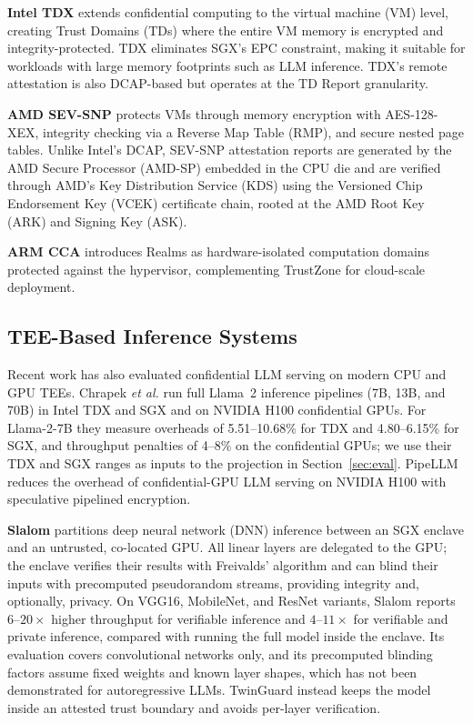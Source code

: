 \documentclass{ieeeaccess}
\begin{document}
\textbf{Intel TDX} \cite{inteltdx2023} extends confidential computing to the virtual machine (VM) level, creating Trust Domains (TDs) where the entire VM
memory is encrypted and integrity-protected. TDX eliminates SGX's EPC
constraint, making it suitable for workloads with large memory footprints
such as LLM inference. TDX's remote attestation is also DCAP-based but
operates at the TD Report granularity.

\textbf{AMD SEV-SNP} \cite{amdsev2020} protects VMs through memory
encryption with AES-128-XEX, integrity checking via a Reverse Map Table (RMP),
and secure nested page tables. Unlike Intel's DCAP, SEV-SNP attestation
reports are generated by the AMD Secure Processor (AMD-SP) embedded in the
CPU die and are verified through AMD's Key Distribution Service (KDS) using
the Versioned Chip Endorsement Key (VCEK) certificate chain, rooted at the
AMD Root Key (ARK) and Signing Key (ASK).

\textbf{ARM CCA} \cite{armcca2022} introduces Realms as hardware-isolated
computation domains protected against the hypervisor, complementing
TrustZone \cite{pinto2019demystifying} for cloud-scale deployment.

\subsection{TEE-Based Inference Systems}

Recent work has also evaluated confidential LLM serving on modern CPU and GPU
TEEs. Chrapek \emph{et al.} \cite{chrapek2025confidential} run full Llama~2
inference pipelines (7B, 13B, and 70B) in Intel TDX and SGX and on NVIDIA H100
confidential GPUs. For Llama-2-7B they measure overheads of 5.51--10.68\% for
TDX and 4.80--6.15\% for SGX, and throughput penalties of 4--8\% on the
confidential GPUs; we use their TDX and SGX ranges as inputs to the
projection in Section~\ref{sec:eval}. PipeLLM \cite{tan2024pipellm} reduces
the overhead of confidential-GPU LLM serving on NVIDIA H100 with speculative
pipelined encryption.

\textbf{Slalom} \cite{tramer2019slalom} partitions deep neural network (DNN) inference between an
SGX enclave and an untrusted, co-located GPU. All linear layers are delegated
to the GPU; the enclave verifies their results with Freivalds' algorithm and
can blind their inputs with precomputed pseudorandom streams, providing
integrity and, optionally, privacy. On VGG16, MobileNet, and ResNet variants,
Slalom reports $6$--$20\times$ higher throughput for verifiable inference and
$4$--$11\times$ for verifiable and private inference, compared with running
the full model inside the enclave. Its evaluation covers convolutional
networks only, and its precomputed blinding factors assume fixed weights and
known layer shapes, which has not been demonstrated for autoregressive LLMs.
TwinGuard instead keeps the model inside an attested trust boundary and
avoids per-layer verification.
\end{document}

